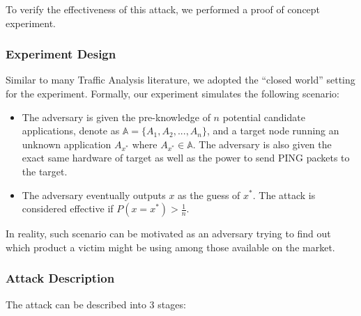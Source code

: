 To verify the effectiveness of this attack, we performed a proof of concept experiment.



\subsubsection{Experiment Design}

Similar to many Traffic Analysis literature, we adopted the ``closed world'' setting for the experiment. Formally, our experiment simulates the following scenario:
\begin{itemize}
 \item The adversary is given the pre-knowledge of $n$ potential candidate applications, denote as $\mathbb{A} = \{A_1, A_2, ..., A_n\}$, and a target node running an unknown application $A_{x^*}$ where $A_{x^*} \in \mathbb{A}$. The adversary is also given the exact same hardware of target as well as the power to send PING packets to the target.
 \item The adversary eventually outputs $x$ as the guess of $x^*$. The attack is considered effective if $P(x = x^*) > \frac{1}{n}$.
\end{itemize}

In reality, such scenario can be motivated as an adversary trying to find out which product a victim might be using among those available on the market.

\subsubsection{Attack Description \label{PingLoadAttackManual}} 

The attack can be described into 3 stages:


